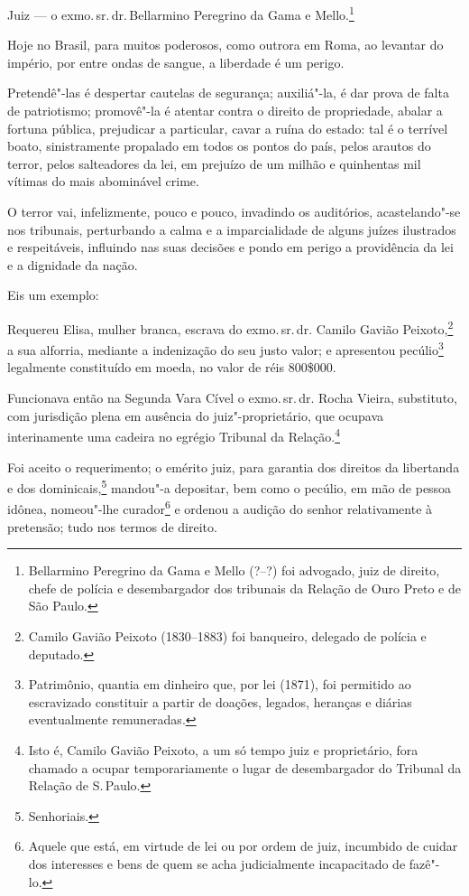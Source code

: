 \noindent{}Juiz --- o exmo.\,sr.\,dr.\,Bellarmino Peregrino da Gama e
Mello.\footnote{Bellarmino Peregrino da Gama e Mello (?--?) foi
  advogado, juiz de direito, chefe de polícia e desembargador dos
  tribunais da Relação de Ouro Preto e de São Paulo.}\smallskip

Hoje no Brasil, para muitos poderosos, como outrora em Roma, ao levantar
do império, por entre ondas de sangue, a liberdade é um perigo.

Pretendê"-las é despertar cautelas de segurança; auxiliá"-la, é dar prova
de falta de patriotismo; promovê"-la é atentar contra o direito de
propriedade, abalar a fortuna pública, prejudicar a particular, cavar a
ruína do estado: tal é o terrível boato, sinistramente propalado em
todos os pontos do país, pelos arautos do terror, pelos salteadores da
lei, em prejuízo de um milhão e quinhentas mil vítimas do mais
abominável crime.

O terror vai, infelizmente, pouco e pouco, invadindo os auditórios,
acastelando"-se nos tribunais, perturbando a calma e a imparcialidade de
alguns juízes ilustrados e respeitáveis, influindo nas suas decisões e
pondo em perigo a providência da lei e a dignidade da nação.

Eis um exemplo:

Requereu Elisa, mulher branca, escrava do exmo.\,sr.\,dr. Camilo Gavião
Peixoto,\footnote{Camilo Gavião Peixoto (1830--1883) foi banqueiro,
  delegado de polícia e deputado.} a sua alforria, mediante a
indenização do seu justo valor; e apresentou pecúlio\footnote{
  Patrimônio, quantia em dinheiro que, por lei (1871), foi permitido ao
  escravizado constituir a partir de doações, legados, heranças e
  diárias eventualmente remuneradas.} legalmente constituído em moeda,
no valor de réis 800\$000.

Funcionava então na Segunda Vara Cível o exmo.\,sr.\,dr. Rocha Vieira,
substituto, com jurisdição plena em ausência do juiz"-proprietário, que
ocupava interinamente uma cadeira no egrégio Tribunal da
Relação.\footnote{Isto é, Camilo Gavião Peixoto, a um só tempo juiz e
  proprietário, fora chamado a ocupar temporariamente o lugar de
  desembargador do Tribunal da Relação de S.\,Paulo.}

Foi aceito o requerimento; o emérito juiz, para garantia dos direitos da
libertanda e dos dominicais,\footnote{Senhoriais.} mandou"-a depositar,
bem como o pecúlio, em mão de pessoa idônea, nomeou"-lhe
curador\footnote{Aquele que está, em virtude de lei ou por ordem de
  juiz, incumbido de cuidar dos interesses e bens de quem se acha
  judicialmente incapacitado de fazê"-lo.} e ordenou a audição do senhor
relativamente à pretensão; tudo nos termos de direito.

